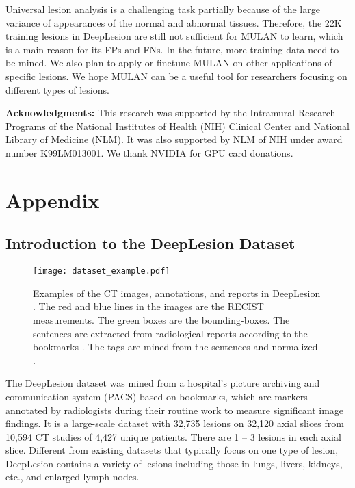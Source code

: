 \documentclass[runningheads]{llncs}
\begin{document}
Universal lesion analysis is a challenging task partially because of the large variance of appearances of the normal and abnormal tissues. Therefore, the 22K training lesions in DeepLesion are still not sufficient for MULAN to learn, which is a main reason for its FPs and FNs. In the future, more training data need to be mined. We also plan to apply or finetune MULAN on other applications of specific lesions. We hope MULAN can be a useful tool for researchers focusing on different types of lesions.

{\small \textbf{Acknowledgments:} This research was supported by the Intramural Research Programs of the National Institutes of Health (NIH) Clinical Center and National Library of Medicine (NLM). It was also supported by NLM of NIH under award number K99LM013001. We thank NVIDIA for GPU card donations.}

\section{Appendix}

\subsection{Introduction to the DeepLesion Dataset}
\begin{figure}[]
	\begin{center}
\texttt{[image: dataset\_example.pdf]} \end{center}
	\caption{Examples of the CT images, annotations, and reports in DeepLesion \cite{Yan2018DeepLesion}. The red and blue lines in the images are the RECIST measurements. The green boxes are the bounding-boxes. The sentences are extracted from radiological reports according to the bookmarks \cite{Yan2019Lesa}. The tags are mined from the sentences and normalized \cite{Yan2019Lesa}.}
	\label{fig:dataset_example}
\end{figure}

The DeepLesion dataset \cite{Yan2018DeepLesion} was mined from a hospital's picture archiving and communication system (PACS) based on bookmarks, which are markers annotated by radiologists during their routine work to measure significant image findings. It is a large-scale dataset with 32,735 lesions on 32,120 axial slices from 10,594 CT studies of 4,427 unique patients. There are 1 -- 3 lesions in each axial slice. Different from existing datasets that typically focus on one type of lesion, DeepLesion contains a variety of lesions including those in lungs, livers, kidneys, etc., and enlarged lymph nodes.
\end{document}
